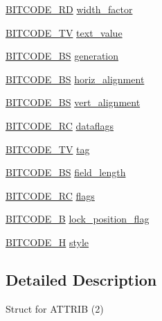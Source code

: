 \begin{DoxyCompactItemize}
\item 
\hyperlink{dwg_8h_a309e7e59a4030a89943640d0d327cef7}{\-B\-I\-T\-C\-O\-D\-E\-\_\-\-R\-D} \hyperlink{struct__dwg__entity__ATTRIB_aedea45018000be61d495d40120f08483}{width\-\_\-factor}
\item 
\hyperlink{dwg_8h_a2a7e040c6e36ca039b03608679ecaf7c}{\-B\-I\-T\-C\-O\-D\-E\-\_\-\-T\-V} \hyperlink{struct__dwg__entity__ATTRIB_a96f28a70b57450b292ab19ed40902347}{text\-\_\-value}
\item 
\hyperlink{dwg_8h_a94297606fbd4a4ff97e8add284af0809}{\-B\-I\-T\-C\-O\-D\-E\-\_\-\-B\-S} \hyperlink{struct__dwg__entity__ATTRIB_a94ac27361df4d1cd7f67f32da36caeba}{generation}
\item 
\hyperlink{dwg_8h_a94297606fbd4a4ff97e8add284af0809}{\-B\-I\-T\-C\-O\-D\-E\-\_\-\-B\-S} \hyperlink{struct__dwg__entity__ATTRIB_ac55a3ed13d54ddc37a7a13092df89bfd}{horiz\-\_\-alignment}
\item 
\hyperlink{dwg_8h_a94297606fbd4a4ff97e8add284af0809}{\-B\-I\-T\-C\-O\-D\-E\-\_\-\-B\-S} \hyperlink{struct__dwg__entity__ATTRIB_a71a90aaf37e911d52e68fbbb3324c3fd}{vert\-\_\-alignment}
\item 
\hyperlink{dwg_8h_a7fd199a8f9c9cc52bdab220f65a2a619}{\-B\-I\-T\-C\-O\-D\-E\-\_\-\-R\-C} \hyperlink{struct__dwg__entity__ATTRIB_ad6eb39b3c3ff8c92df031a5bfb478add}{dataflags}
\item 
\hyperlink{dwg_8h_a2a7e040c6e36ca039b03608679ecaf7c}{\-B\-I\-T\-C\-O\-D\-E\-\_\-\-T\-V} \hyperlink{struct__dwg__entity__ATTRIB_a9242b1b299e4907cad9f87ac438b5e22}{tag}
\item 
\hyperlink{dwg_8h_a94297606fbd4a4ff97e8add284af0809}{\-B\-I\-T\-C\-O\-D\-E\-\_\-\-B\-S} \hyperlink{struct__dwg__entity__ATTRIB_a040dd9cc1c8d618084a7e947e42f8534}{field\-\_\-length}
\item 
\hyperlink{dwg_8h_a7fd199a8f9c9cc52bdab220f65a2a619}{\-B\-I\-T\-C\-O\-D\-E\-\_\-\-R\-C} \hyperlink{struct__dwg__entity__ATTRIB_a62ece5d88033476ffe31cfae9736bb9f}{flags}
\item 
\hyperlink{dwg_8h_ab533b1f62d9086749e3bb5b67e9f224e}{\-B\-I\-T\-C\-O\-D\-E\-\_\-\-B} \hyperlink{struct__dwg__entity__ATTRIB_abccf2be2a6e77bcdd86c8c50474ba0f9}{lock\-\_\-position\-\_\-flag}
\item 
\hyperlink{dwg_8h_a7c700e94e047a97ba8c24bdfe4029dc3}{\-B\-I\-T\-C\-O\-D\-E\-\_\-\-H} \hyperlink{struct__dwg__entity__ATTRIB_a21fd47d00149daa31671b62ced4642c3}{style}
\end{DoxyCompactItemize}


\subsection{\-Detailed \-Description}
\-Struct for \-A\-T\-T\-R\-I\-B (2) 

